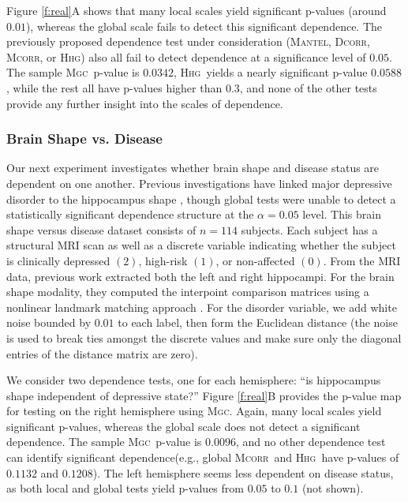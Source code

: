 \documentclass[11pt]{article}
\providecommand{\sct}[1]{{\normalfont\textsc{#1}}}
\newcommand{\Mgc}{\sct{Mgc}}
\newcommand{\Hhg}{\sct{Hhg}}
\newcommand{\Dcorr}{\sct{Dcorr}}
\newcommand{\Mcorr}{\sct{Mcorr}}
\newcommand{\Mantel}{\sct{Mantel}}
\begin{document}


Figure \ref{f:real}{\color{magenta}A}  shows that many local scales yield significant p-values (around $0.01$), whereas the global scale fails to detect this significant dependence. The previously proposed dependence test under consideration (\Mantel, \Dcorr, \Mcorr, or \Hhg) also all fail to detect dependence at a significance level of $0.05$. The sample \Mgc~p-value is $0.0342$, \Hhg~yields a nearly significant p-value $0.0588$, while the rest all have p-values higher than $0.3$, and none of the other tests provide any further insight into the scales of dependence.


\subsubsection*{Brain Shape vs. Disease} %


Our next experiment investigates whether brain shape and disease status are dependent on one another.  Previous investigations have linked major depressive disorder to the hippocampus shape \cite{ParkEtAl2008,PosenerEtAl2003}, though global tests were unable to detect a statistically significant dependence structure at the $\alpha=0.05$ level.
%
This brain shape versus disease dataset consists of $n=114$ subjects. Each subject has a structural MRI scan as well as a discrete variable indicating whether the subject is clinically depressed $(2)$, high-risk $(1)$, or non-affected $(0)$.  From the MRI data, previous work  extracted both the left and right hippocampi.   For the brain shape modality, they computed the interpoint comparison matrices using a nonlinear landmark matching approach \cite{ParkEtAl2008,BegEtAl2005}. For the  disorder variable, we add white noise bounded by $0.01$ to each label, then form the Euclidean distance (the noise is used to break ties amongst the discrete values and make sure only the diagonal entries of the distance matrix are zero).

We consider two dependence tests, one for each hemisphere: ``is hippocampus shape independent of depressive state?''
Figure \ref{f:real}{\color{magenta}B} provides the p-value map for testing on the right hemisphere using \Mgc. Again, many local scales yield significant p-values, whereas the global scale does not detect a significant dependence. The sample \Mgc~p-value is $0.0096$, and no other dependence test can identify significant dependence(e.g., global \Mcorr~and \Hhg~have p-values of $0.1132$ and $0.1208$). The left hemisphere seems less dependent on disease status, as both local and global tests yield p-values from $0.05$ to $0.1$ (not shown). 
\end{document}
